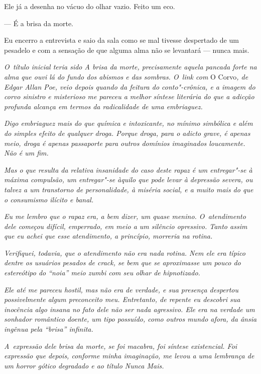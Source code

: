 Ele já a desenha no vácuo do olhar vazio. Feito um eco.

— É a brisa da morte.

Eu encerro a entrevista e saio da sala como se mal tivesse despertado de
um pesadelo e com a sensação de que alguma alma não se levantará ---
nunca mais.~

\begin{center}\asterisc{}\end{center}
\begingroup\small

\emph{O~título inicial teria sido A brisa da morte, precisamente aquela
pancada forte na alma que ouvi lá do fundo dos abismos e das sombras. O~link com} O Corvo\emph{, de Edgar Allan Poe, veio depois quando da feitura do
conto"-crônica, e a imagem do corvo sinistro e misterioso me pareceu a
melhor síntese literária do que a adicção profunda alcança em termos da
radicalidade de uma embriaguez.}~

\emph{Digo embriaguez mais do que química e intoxicante, no mínimo
simbólica e além do simples efeito de qualquer droga. Porque droga, para
o adicto grave, é apenas meio, droga é apenas passaporte para outros
domínios imaginados loucamente. Não é um fim.}~

\emph{Mas o que resulta da relativa insanidade do caso deste rapaz é um
entregar"-se à máxima compulsão, um entregar"-se àquilo que pode levar à
depressão severa, ou talvez a um transtorno de personalidade, à miséria
social, e a muito mais do que o consumismo ilícito e banal.}~

\emph{Eu me lembro que o rapaz era, a bem dizer, um quase menino. O~atendimento dele começou difícil, emperrado, em meio a um silêncio
opressivo. Tanto assim que eu achei que esse atendimento, a princípio,
morreria na rotina.}~

\emph{Verifiquei, todavia, que o atendimento não era nada rotina. Nem
ele era típico dentre os usuários pesados de crack, se bem que se
aproximasse um pouco do estereótipo do ``noia'' meio zumbi com seu olhar
de hipnotizado.}~

\emph{Ele até me pareceu hostil, mas não era de verdade, e sua presença
despertou possivelmente algum preconceito meu. Entretanto, de repente eu
descobri sua inocência algo insana no fato dele não ser nada agressivo.
Ele era na verdade um sonhador romântico doente, um tipo possuído, como
outros mundo afora, da ânsia ingênua pela ``brisa'' infinita.}~

\emph{A~expressão dele brisa da morte, se foi macabra, foi síntese
existencial. Foi expressão que depois, conforme minha imaginação, me
levou a uma lembrança de um horror gótico degradado e ao título Nunca
Mais.}~

